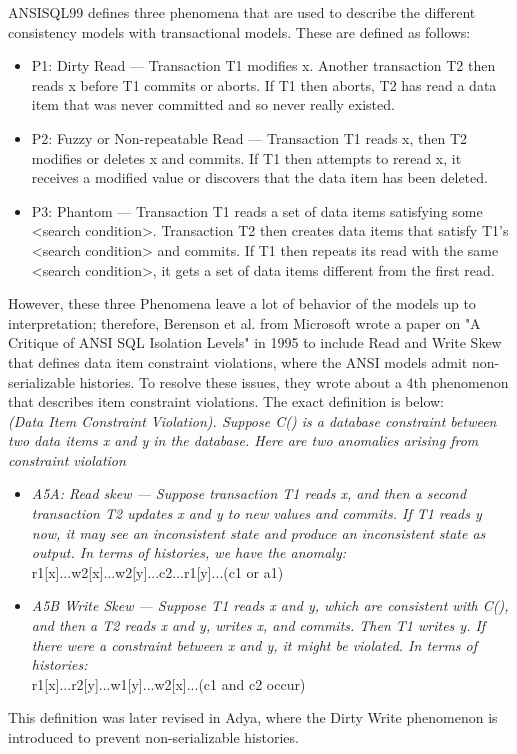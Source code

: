 \documentclass[a4paper,10pt,titlepage]{report}
\begin{document}
   ANSISQL99\cite{ansisql1999} defines three phenomena that are used to describe the different consistency models with transactional models. These are defined as follows:
    \begin{itemize}
        \item P1: Dirty Read — Transaction T1 modifies x. Another transaction T2 then reads x before T1 commits or aborts. If T1 then aborts, T2 has read a data item that was never committed and so never really existed.
        \item P2: Fuzzy or Non-repeatable Read — Transaction T1 reads x, then T2 modifies or deletes x and commits. If T1 then attempts to reread x, it receives a modified value or discovers that the data item has been deleted.
        \item P3: Phantom — Transaction T1 reads a set of data items satisfying some <search condition>. Transaction T2 then creates data items that satisfy T1's <search condition> and commits. If T1 then repeats its read with the same <search condition>, it gets a set of data items different from the first read.
    \end{itemize}


    However, these three Phenomena leave a lot of behavior of the models up to interpretation; therefore, Berenson et al\cite{Berensonetal}. from Microsoft wrote a paper on "A Critique of ANSI SQL Isolation Levels" in 1995 to include Read and Write Skew that defines data item constraint violations, where the ANSI models admit non-serializable histories. To resolve these issues, they wrote about a 4th phenomenon that describes item constraint violations. The exact definition is below: \\

\textit{(Data Item Constraint Violation). Suppose C() is a database constraint between two data items x and y in the database. Here are two anomalies arising from constraint violation}\\
    \begin{itemize}
        \item \textit{A5A: Read skew — Suppose transaction T1 reads x, and then a second transaction T2 updates x and y to new values and commits. If T1 reads y now, it may see an inconsistent state and produce an inconsistent state as output.
        In terms of histories, we have the anomaly:  } \\
         r1[x]...w2[x]...w2[y]...c2...r1[y]...(c1 or a1)
        \item \textit{A5B Write Skew — Suppose T1 reads x and y, which are
        consistent with C(), and then a T2 reads x and y, writes x,
            and commits. Then T1 writes y. If there were a constraint
            between x and y, it might be violated. In terms of histories:} \\
        r1[x]...r2[y]...w1[y]...w2[x]...(c1 and c2 occur)
    \end{itemize}
    This definition was later revised in Adya, \cite{Adya99weakconsistency} where the Dirty Write phenomenon is introduced to prevent non-serializable histories.
\end{document}
